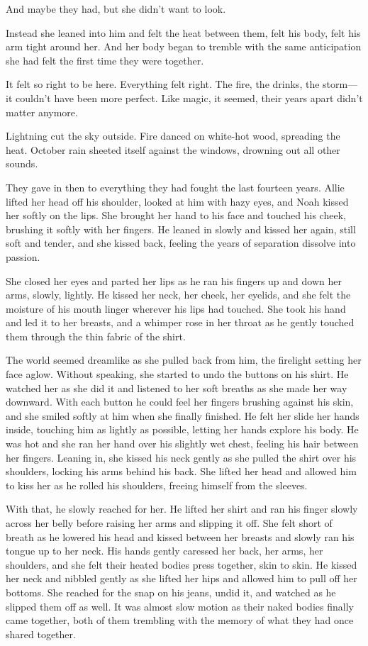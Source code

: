\documentclass[10pt, twoside, openright]{book}
\begin{document}
And maybe they had, but she didn't want to look.


Instead she leaned into him and felt the heat between them, felt his
body, felt his arm tight around her. And her body began to tremble with
the same anticipation she had felt the first time they were together.

It felt so right to be here. Everything felt right. The fire, the
drinks, the storm---it couldn't have been more perfect. Like magic, it
seemed, their years apart didn't matter anymore.

Lightning cut the sky outside. Fire danced on white-hot wood, spreading
the heat. October rain sheeted itself against the windows, drowning out
all other sounds.

They gave in then to everything they had fought the last fourteen years.
Allie lifted her head off his shoulder, looked at him with hazy eyes,
and Noah kissed her softly on the lips. She brought her hand to his face
and touched his cheek, brushing it softly with her fingers. He leaned in
slowly and kissed her again, still soft and tender, and she kissed back,
feeling the years of separation dissolve into passion.

She closed her eyes and parted her lips as he ran his fingers up and
down her arms, slowly, lightly. He kissed her neck, her cheek, her
eyelids, and she felt the moisture of his mouth linger wherever his lips
had touched. She took his hand and led it to her breasts, and a whimper
rose in her throat as he gently touched them through the thin fabric of
the shirt.

The world seemed dreamlike as she pulled back from him, the firelight
setting her face aglow. Without speaking, she started to undo the
buttons on his shirt. He watched her as she did it and listened to her
soft breaths as she made her way downward. With each button he could
feel her fingers brushing against his skin, and she smiled softly at him
when she finally finished. He felt her slide her hands inside, touching
him as lightly as possible, letting her hands explore his body. He was
hot and she ran her hand over his slightly wet chest, feeling his hair
between her fingers. Leaning in, she kissed his neck gently as she
pulled the shirt over his shoulders, locking his arms behind his back.
She lifted her head and allowed him to kiss her as he rolled his
shoulders, freeing himself from the sleeves.

With that, he slowly reached for her. He lifted her shirt and ran his
finger slowly across her belly before raising her arms and slipping it
off. She felt short of breath as he lowered his head and kissed between
her breasts and slowly ran his tongue up to her neck. His hands gently
caressed her back, her arms, her shoulders, and she felt their heated
bodies press together, skin to skin. He kissed her neck and nibbled
gently as she lifted her hips and allowed him to pull off her bottoms.
She reached for the snap on his jeans, undid it, and watched as he
slipped them off as well. It was almost slow motion as their naked
bodies finally came together, both of them trembling with the memory of
what they had once shared together.
\end{document}
